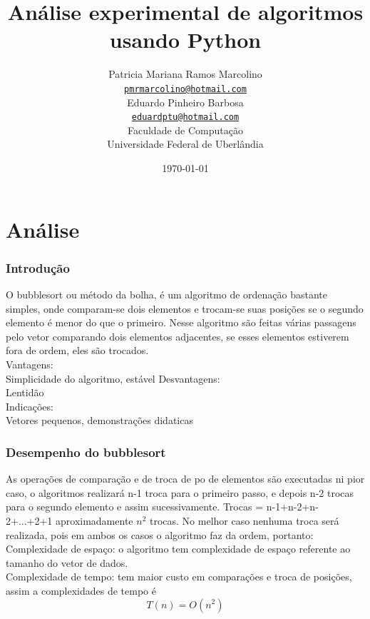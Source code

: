 \documentclass[12pt,a4paper,twoside]{report}
\title{Análise experimental de algoritmos usando Python}
\author{Patricia Mariana Ramos Marcolino\\
\texttt{\small \url{pmrmarcolino@hotmail.com}}
\vspace{1cm} \\
Eduardo Pinheiro Barbosa \\
\texttt{\small \url{eduardptu@hotmail.com}}
\vspace{1cm} \\
Faculdade de Computação \\
Universidade Federal de Uberlândia
}
\date{\today}
\begin{document}
\maketitle
\listoffigures
\listoftables
\lstlistoflistings

\tableofcontents
\fancyhead[RE,LO]{\thesection}

\setlength{\parskip}{0.15in} %

\chapter{Análise}
\subsection{Introdução}
O bubblesort ou método da bolha, é um algoritmo de ordenação bastante simples, onde comparam-se dois elementos e trocam-se suas posições se o segundo elemento é menor do que o  primeiro. Nesse algoritmo são feitas várias passagens pelo vetor comparando dois elementos adjacentes, se esses elementos estiverem fora de ordem, eles são trocados.\\
Vantagens:\\
    Simplicidade do algoritmo, estável
Desvantagens:\\
    Lentidão\\
Indicações:\\
    Vetores pequenos, demonstrações didaticas

\subsection{Desempenho do bubblesort}
As operações de comparação e de troca de po de elementos são executadas ni pior caso, o algoritmos realizará n-1 troca para o primeiro passo, e depois n-2 trocas para o segundo elemento e assim sucessivamente. Trocas = n-1+n-2+n-2+...+2+1 aproximadamente $n^2$
trocas. No melhor caso nenhuma troca será realizada, pois em ambos os casos o algoritmo faz da ordem, portanto:\\
Complexidade de espaço: o algoritmo tem complexidade de espaço referente ao tamanho do vetor de dados.\\
Complexidade de tempo: tem maior custo em comparações e troca de posições, assim a complexidades de tempo é
\[T(n) = O(n^2)\] 
\end{document}
